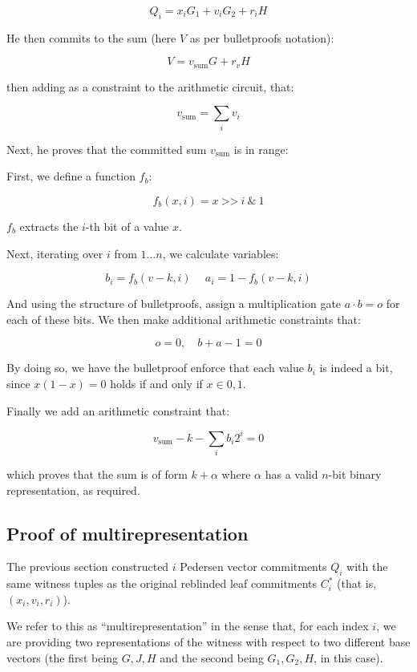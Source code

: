 \documentclass[10pt,a4paper]{article}
\begin{document}
$$Q_i = x_i G_1 + v_i G_2 + r_i H$$

He then commits to the sum (here $V$ as per bulletproofs notation):

$$ V = v_{\textrm{sum}} G + r_v H$$

then adding as a constraint to the arithmetic circuit, that:

$$ v_{\textrm{sum}} = \sum_i v_i $$

Next, he proves that the committed sum $v_{\textrm{sum}}$ is in range:

First, we define a function $f_b$:

$$ f_b(x, i) = x\ \texttt{>>}\ i \ \texttt{\&}\ 1$$

$f_b$ extracts the $i$-th bit of a value $x$.

Next, iterating over $i$ from $1 \ldots n$, we calculate  variables:

$$b_i = f_b(v-k, i)\ \quad a_i = 1 - f_b(v-k, i)$$

And using the structure of bulletproofs, assign a multiplication gate $a \cdot b = o$ for each of these bits. We then make additional arithmetic constraints that:

$$ o=0, \quad b+a-1=0 $$

By doing so, we have the bulletproof enforce that each value $b_i$ is indeed a bit, since $x(1-x)=0$ holds if and only if $x \in {0,1}$.

\vspace{5 pt}

Finally we add an arithmetic constraint that:

$$v_{\textrm{sum}} - k - \sum_i b_i 2^i = 0$$

which proves that the sum is of form $k+\alpha$ where $\alpha$ has a valid $n$-bit binary representation, as required.

\subsection{Proof of multirepresentation}

The previous section constructed $i$ Pedersen vector commitments $Q_i$ with the same witness tuples as the original reblinded leaf commitments $C_i^*$ (that is, $(x_i, v_i, r_i)$).

We refer to this as ``multirepresentation'' in the sense that, for each index $i$, we are providing two representations of the witness with respect to two different base vectors (the first being $G, J, H$ and the second being $G_1, G_2, H$, in this case).
\end{document}
